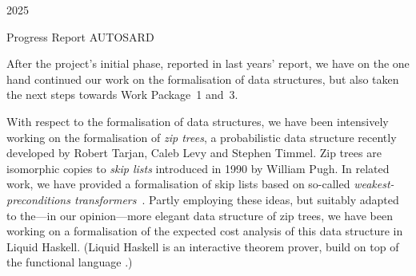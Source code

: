 \documentclass[10pt,a4paper]{article}
\begin{document}

\vspace*{23mm}
\noindent\hspace{35ex}
2025

\vspace*{10mm}

\begin{center}
\large \normalsize Progress Report AUTOSARD 
\end{center}

After the project's initial phase, reported in last years' report, we have
on the one hand continued our work on the formalisation of data structures, but also taken the
next steps towards Work Package~1 and~3.

With respect to the formalisation of data structures, we have been intensively working
on the formalisation of \emph{zip trees}, a probabilistic data structure recently developed
by Robert Tarjan, Caleb Levy and Stephen Timmel. Zip trees are isomorphic copies to
\emph{skip lists} introduced in 1990 by William Pugh.
%
In related work, we have provided a formalisation of skip lists based on so-called \emph{weakest-preconditions transformers}~\cite{AvanziniBGMV24}. Partly employing these ideas, but suitably adapted
to the---in our opinion---more elegant data structure of zip trees, we have been working on
a formalisation of the expected cost analysis of this data structure in Liquid Haskell.
(Liquid Haskell is an interactive theorem prover, build on top of the functional
language \Haskell.)
\end{document}
